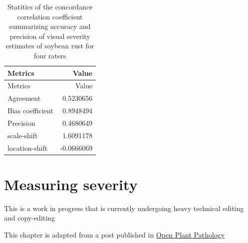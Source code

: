 \documentclass[
  letterpaper,
  DIV=11,
  numbers=noendperiod]{scrreprt}
\begin{document}
\hypertarget{tbl-ccc}{}
\begin{longtable}[]{@{}lr@{}}
\caption{\label{tbl-ccc}Statitics of the concordance correlation
coefficient summarizing accuracy and precision of visual severity
estimates of soybean rust for four raters}\tabularnewline
\toprule()
Metrics & Value \\
\midrule()
\endfirsthead
\toprule()
Metrics & Value \\
\midrule()
\endhead
Agreement & 0.5230656 \\
Bias coefficient & 0.8948494 \\
Precision & 0.4680649 \\
scale-shift & 1.6091178 \\
location-shift & -0.0666069 \\
\bottomrule()
\end{longtable}

\hypertarget{measuring-severity}{%
\chapter{Measuring severity}\label{measuring-severity}}

\begin{tcolorbox}[enhanced jigsaw, rightrule=.15mm, left=2mm, breakable, colframe=quarto-callout-note-color-frame, toprule=.15mm, leftrule=.75mm, bottomrule=.15mm, colback=white, arc=.35mm, opacityback=0]
\begin{minipage}[t]{5.5mm}
\textcolor{quarto-callout-note-color}{\faInfo}
\end{minipage}%
\begin{minipage}[t]{\textwidth - 5.5mm}
This is a work in progress that is currently undergoing heavy technical
editing and copy-editing\end{minipage}%
\end{tcolorbox}

\begin{tcolorbox}[enhanced jigsaw, rightrule=.15mm, left=2mm, breakable, colframe=quarto-callout-important-color-frame, toprule=.15mm, leftrule=.75mm, bottomrule=.15mm, colback=white, arc=.35mm, opacityback=0]
\begin{minipage}[t]{5.5mm}
\textcolor{quarto-callout-important-color}{\faExclamation}
\end{minipage}%
\begin{minipage}[t]{\textwidth - 5.5mm}
This chapter is adapted from a post published in
\href{https://openplantpathology.org/posts/2021-05-31-measuring-plant-disease-severity-using-the-pliman-r-package/}{Open
Plant Pathology}\end{minipage}%
\end{tcolorbox}
\end{document}
